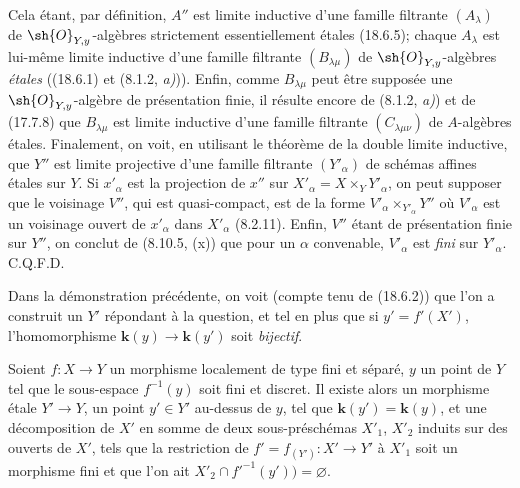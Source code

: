 Cela étant, par définition, $A''$ est limite inductive d'une famille filtrante $(A_\lambda)$ de $\sh{O}_{Y,y}$-algèbres strictement essentiellement étales (18.6.5); chaque $A_\lambda$ est lui-même limite inductive d'une famille filtrante $(B_{\lambda\mu})$ de $\sh{O}_{Y,y}$-algèbres \emph{étales} ((18.6.1) et (8.1.2, \emph{a)})). Enfin, comme $B_{\lambda\mu}$ peut être supposée une $\sh{O}_{Y,y}$-algèbre de présentation finie, il résulte encore de (8.1.2, \emph{a)}) et de (17.7.8) que $B_{\lambda\mu}$ est limite inductive d'une famille filtrante $(C_{\lambda\mu\nu})$ de $A$-algèbres étales. Finalement, on voit, en utilisant le théorème de la double limite inductive, que $Y''$ est limite projective d'une famille filtrante $(Y'_\alpha)$ de schémas affines étales sur $Y$. Si $x'_\alpha$ est la projection de $x''$ sur $X'_\alpha=X\times_Y Y'_\alpha$, on peut supposer que le voisinage $V''$, qui est quasi-compact, est de la forme $V'_\alpha\times_{Y'_\alpha}Y''$ où $V'_\alpha$ est un voisinage ouvert de $x'_\alpha$ dans $X'_\alpha$ (8.2.11). Enfin, $V''$ étant de présentation finie sur $Y''$, on conclut de (8.10.5, (x)) que pour un $\alpha$ convenable, $V'_\alpha$ est \emph{fini} sur $Y'_\alpha$. C.Q.F.D.

\begin{remark}[18.12.2]
\label{IV.18.12.2}
Dans la démonstration précédente, on voit (compte tenu de (18.6.2)) que l'on a construit un $Y'$ répondant à la question, et tel en plus que si $y'=f'(X')$, l'homomorphisme $\boldsymbol{k}(y)\to\boldsymbol{k}(y')$ soit \emph{bijectif}.
\end{remark}

\begin{corollary}[18.12.3]
\label{IV.18.12.3}
Soient $f:X\to Y$ un morphisme localement de type fini et séparé, $y$ un point de $Y$ tel que le sous-espace $f^{-1}(y)$ soit fini et discret. Il existe alors un morphisme étale $Y'\to Y$, un point $y'\in Y'$ au-dessus de $y$, tel que $\boldsymbol{k}(y')=\boldsymbol{k}(y)$, et une décomposition de $X'$ en somme de deux sous-préschémas $X'_1$, $X'_2$ induits sur des ouverts de $X'$, tels que la restriction de $f'=f_{(Y')}:X'\to Y'$ à $X'_1$ soit un morphisme fini et que l'on ait $X'_2\cap f'^{-1}(y'))=\varnothing$.
\end{corollary}

